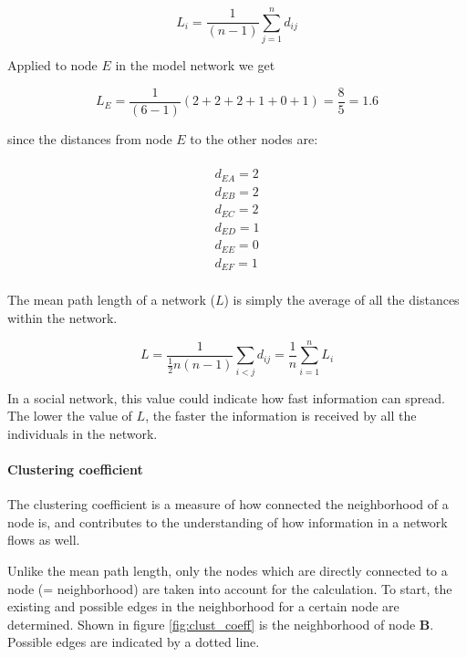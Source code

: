 \begin{equation}
L_i = \frac{1}{(n-1)}\sum^n_{j=1} d_{ij}
\label{eq:average_path_lenght}
\end{equation}

Applied to node $E$ in the model network we get

\begin{equation}
L_E = \frac{1}{(6-1)}(2 + 2 + 2 + 1 + 0 + 1) = \frac{8}{5} = 1.6
\label{eq:average_path_lenght_e}
\end{equation}

since the distances from node $E$ to the other nodes are:

\begin{multline} 
\\d_{EA} = 2 \\
d_{EB} = 2 \\
d_{EC} = 2 \\
d_{ED} = 1 \\
d_{EE} = 0 \\
d_{EF} = 1 \\
\label{eq:distances_e}
\end{multline}

The mean path length of a network ($L$) is simply the average of all the distances within the network.

\begin{equation}
L = \frac{1}{ \frac{1}{2}n(n-1)}\sum_{i<j} d_{ij} = \frac{1}{n}\sum^n_{i=1}L_i
\label{eq:mean_path_lenght}
\end{equation} 

In a social network, this value could indicate how fast information can spread. The lower the value of $L$, the faster the information is received by all the individuals in the network. 

\paragraph{Clustering coefficient}

The clustering coefficient is a measure of how connected the neighborhood of a node is, and contributes to the understanding of how information in a network flows as well.

Unlike the mean path length, only the nodes which are directly connected to a node (= neighborhood) are taken into account for the calculation. To start, the existing and possible edges in the neighborhood for a certain node are determined. Shown in figure \ref{fig:clust_coeff} is the neighborhood of node \textbf{B}. Possible edges are indicated by a dotted line.

